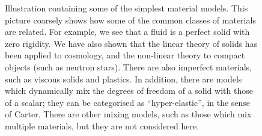 \begin{figure}[!t]
\begin{centering}
\caption{Illustration containing some of the simplest material models. This picture coarsely shows how some of the common classes of materials are related. For example, we see that a fluid is a perfect solid with zero rigidity. We have also shown that the linear theory of solids has been applied to cosmology, and the non-linear theory to compact objects (such as neutron stars). There are also imperfect materials, such as viscous solids and plastics. In addition, there are models which dynamically mix the degrees of freedom of a solid with those of a scalar; they can be categorised as ``hyper-elastic'', in the sense of Carter. There are other mixing models, such as those which mix multiple materials, but they are not considered here.}\label{fig:shem_roadmap}
\end{centering}
\end{figure}
 